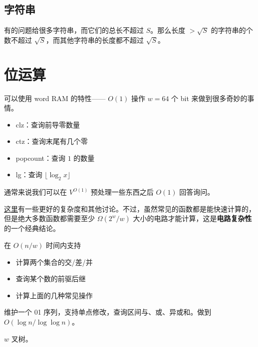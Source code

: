 \subsection{字符串}

有的问题给很多字符串，而它们的总长不超过 $S$。那么长度 $>\sqrt{S}$ 的字符串的个数不超过 $\sqrt{S}$，而其他字符串的长度都不超过 $\sqrt{S}$。

\section{位运算}

可以使用 word RAM 的特性—— $O(1)$ 操作 $w=64$ 个 bit 来做到很多奇妙的事情。

\begin{example}[常见操作]
    \begin{itemize}
        \item clz：查询前导零数量
        \item ctz：查询末尾有几个零
        \item popcount：查询 $1$ 的数量
        \item lg：查询 $\lfloor \log_2 x \rfloor$
    \end{itemize}
    通常来说我们可以在 $V^{O(1)}$ 预处理一些东西之后 $O(1)$ 回答询问。
\end{example}
\begin{remark}
    \href{https://www.zhihu.com/people/hqztrue/posts}{这里}有一些更好的复杂度和其他讨论。不过，虽然常见的函数都是能快速计算的，但是绝大多数函数都需要至少 $\Omega(2^w/w)$ 大小的电路才能计算，这是\textbf{电路复杂性}的一个经典结论。
\end{remark}

\begin{example}[bitset]
    在 $O(n/w)$ 时间内支持
    \begin{itemize}
        \item 计算两个集合的交/差/并
        \item 查询某个数的前驱后继
        \item 计算上面的几种常见操作
    \end{itemize}
\end{example}


\begin{example}[维护 01 序列]
    维护一个 01 序列，支持单点修改，查询区间与、或、异或和。做到 $O(\log n/\log\log n)$。
\end{example}
\begin{solution}
    $w$ 叉树。
\end{solution}

